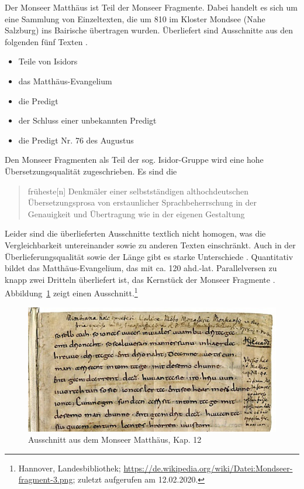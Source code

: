 Der Monseer Matthäus ist Teil der Monseer Fragmente. Dabei handelt es sich um eine Sammlung von Einzeltexten, die um 810 im Kloster Mondsee (Nahe Salzburg) ins Bairische übertragen wurden. Überliefert sind Ausschnitte aus den folgenden fünf Texten \parencite{Krotz2003}.


\begin{itemize}
\item Teile von Isidors  
\item das Matthäus-Evangelium
\item die Predigt 
\item der Schluss einer unbekannten Predigt
\item die Predigt Nr. 76 des Augustus
\end{itemize}

Den Monseer Fragmenten als Teil der sog. Isidor-Gruppe wird eine hohe Übersetzungsqualität zugeschrieben. Es sind die \blockcquote[129]{Sonderegger2003}{früheste[n] Denkmäler einer selbstständigen althochdeutschen Übersetzungsprosa von erstaunlicher Sprachbeherrschung in der Genauigkeit und Übertragung wie in der eigenen Gestaltung}. 
Leider sind die überlieferten Ausschnitte textlich nicht homogen, was die Vergleichbarkeit untereinander sowie zu anderen Texten einschränkt. Auch in der Überlieferungsqualität sowie der Länge gibt es starke Unterschiede \parencite[s. ausführlich][]{Krotz2002,Krotz2003}. Quantitativ bildet das Matthäus-Evangelium, das mit ca. 120 ahd.-lat. Parallelversen zu knapp zwei Dritteln überliefert ist, das Kernstück der Monseer Fragmente 
\parencites()()[82]{Matzel1970}[26--27]{Schlachter2012}.
Abbildung~\ref{abb:MF-handschrift} zeigt einen Ausschnitt.\footnote{Hannover, Landesbibliothek; \url{https://de.wikipedia.org/wiki/Datei:Mondseer-fragment-3.png}; zuletzt aufgerufen am 12.02.2020.} 

\begin{figure}[h]
\begin{center}
  \includegraphics[width=10 cm]{images/MF-handschrift-ausschnitt.jpg}
\caption {Ausschnitt aus dem Monseer Matthäus, Kap. 12}
\label{abb:MF-handschrift}
\end{center}
\end{figure} 

